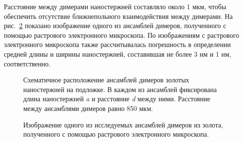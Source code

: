 Расстояние между димерами наностержней составляло около 1 мкм, чтобы обеспечить отсутствие ближнепольного взаимодействия между димерами. На рис.~\ref{img:SEMsample} показано изображение одного из ансамблей димеров, полученного с помощью растрового электронного микроскопа.
По изображениям с растрового электронного микроскопа также рассчитывалась погрешность в определении средней длины и ширины наностержней, составившая не более 3 нм и 1 нм, соответственно.
\begin{figure}[!h]
\caption{Схематичное расположение ансамблей димеров золотых наностержней на подложке. В каждом из ансамблей фиксирована длина наностержней \textit{a} и расстояние \textit{d} между ними. Расстояние между ансамблями димеров равно 850 мкм.}
\label{img:sample}
\end{figure}
\begin{figure}[!h]
\caption{Изображение одного из исследуемых ансамблей димеров из золота, полученного с помощью растрового электронного микроскопа.}
\label{img:SEMsample}
\end{figure}